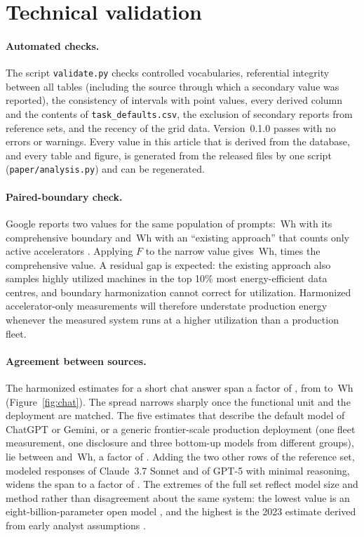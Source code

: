 \documentclass[11pt]{article}
\newcommand{\version}{0.1.0}
\newcommand{\file}[1]{\texttt{#1}}
\newcommand{\Wh}{\,Wh}
\begin{document}
\section{Technical validation}
\label{sec:validation}

\paragraph{Automated checks.}
The script \file{validate.py} checks controlled vocabularies, referential integrity between all tables (including the source through which a secondary value was reported), the consistency of intervals with point values, every derived column and the contents of \file{task\_defaults.csv}, the exclusion of secondary reports from reference sets, and the recency of the grid data. Version~\version{} passes with no errors or warnings. Every value in this article that is derived from the database, and every table and figure, is generated from the released files by one script (\file{paper/analysis.py}) and can be regenerated.

\paragraph{Paired-boundary check.}
Google reports two values for the same population of prompts: \googleFull\Wh{} with its comprehensive boundary and \googleNarrow\Wh{} with an ``existing approach'' that counts only active accelerators \citep{elsworth2025measuring}. Applying $F$ to the narrow value gives \googleHarm\Wh, \googleResidual{} times the comprehensive value. A residual gap is expected: the existing approach also samples highly utilized machines in the top 10\% most energy-efficient data centres, and boundary harmonization cannot correct for utilization. Harmonized accelerator-only measurements will therefore understate production energy whenever the measured system runs at a higher utilization than a production fleet.

\paragraph{Agreement between sources.}
The \chatAllN{} harmonized estimates for a short chat answer span a factor of \chatAllRatio{}, from \chatAllMin{} to \chatAllMax\Wh{} (Figure~\ref{fig:chat}). The spread narrows sharply once the functional unit and the deployment are matched. The five estimates that describe the default model of ChatGPT or Gemini, or a generic frontier-scale production deployment (one fleet measurement, one disclosure and three bottom-up models from different groups), lie between \clusterMin{} and \clusterMax\Wh, a factor of \clusterRatio. Adding the two other rows of the reference set, modeled responses of Claude~3.7 Sonnet and of GPT-5 with minimal reasoning, widens the span to a factor of \chatRefSpan. The extremes of the full set reflect model size and method rather than disagreement about the same system: the lowest value is an eight-billion-parameter open model \citep{odonnell2025math}, and the highest is the 2023 estimate derived from early analyst assumptions \citep{devries2023growing}.
\end{document}
